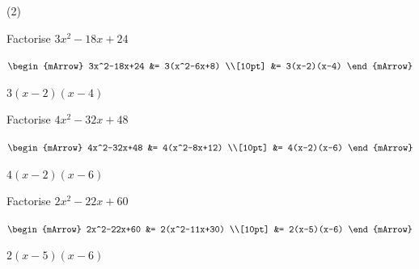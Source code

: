 \begin{mtask}(2)
   \task \begin{exercise} Factorise $3x^2-18x+24$\\
             \begin{envSolution}
			      
			      $\begin{mArrow}
			        3x^2-18x+24  &= 3(x^2-6x+8)                      \\[10pt]
                                 &= 3(x-2)(x-4)					
				 \end{mArrow}$
                 \begin{shortsolution}  
				       $3(x-2)(x-4)$
			     \end{shortsolution}				 
               \end{envSolution}
         \end{exercise}

   \task \begin{exercise} Factorise $4x^2-32x+48$\\
             \begin{envSolution}
			      
			      $\begin{mArrow}
			        4x^2-32x+48  &= 4(x^2-8x+12)                      \\[10pt] 
                                 &= 4(x-2)(x-6)					
				 \end{mArrow}$
                 \begin{shortsolution}  
				       $4(x-2)(x-6)$
			     \end{shortsolution}				 
               \end{envSolution}
         \end{exercise}

   \task \begin{exercise} Factorise $2x^2-22x+60$\\
             \begin{envSolution}			      
			      $\begin{mArrow}
			         2x^2-22x+60  &= 2(x^2-11x+30)                      \\[10pt] 
                                  &= 2(x-5)(x-6)					 
				 \end{mArrow}$
                 \begin{shortsolution}  
				       $2(x-5)(x-6)$
			     \end{shortsolution}				 
               \end{envSolution}
         \end{exercise}


\end{mtask}
